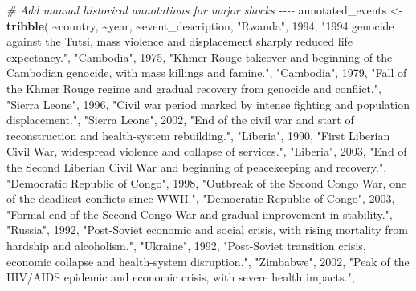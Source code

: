 \documentclass[
  11pt,
]{article}
\newenvironment{Shaded}{\begin{snugshade}}{\end{snugshade}}
\newcommand{\CommentTok}[1]{\textcolor[rgb]{0.56,0.35,0.01}{\textit{#1}}}
\newcommand{\DecValTok}[1]{\textcolor[rgb]{0.00,0.00,0.81}{#1}}
\newcommand{\FunctionTok}[1]{\textcolor[rgb]{0.13,0.29,0.53}{\textbf{#1}}}
\newcommand{\NormalTok}[1]{#1}
\newcommand{\OtherTok}[1]{\textcolor[rgb]{0.56,0.35,0.01}{#1}}
\newcommand{\SpecialCharTok}[1]{\textcolor[rgb]{0.81,0.36,0.00}{\textbf{#1}}}
\newcommand{\StringTok}[1]{\textcolor[rgb]{0.31,0.60,0.02}{#1}}
\begin{document}
\begin{Shaded}
\begin{Highlighting}[]
\CommentTok{\# Add manual historical annotations for major shocks {-}{-}{-}{-}}
\NormalTok{annotated\_events }\OtherTok{\textless{}{-}} \FunctionTok{tribble}\NormalTok{(}
  \SpecialCharTok{\textasciitilde{}}\NormalTok{country, }\SpecialCharTok{\textasciitilde{}}\NormalTok{year, }\SpecialCharTok{\textasciitilde{}}\NormalTok{event\_description,}
  \StringTok{"Rwanda"}\NormalTok{, }\DecValTok{1994}\NormalTok{, }\StringTok{"1994 genocide against the Tutsi, mass violence and displacement sharply reduced life expectancy."}\NormalTok{,}
  \StringTok{"Cambodia"}\NormalTok{, }\DecValTok{1975}\NormalTok{, }\StringTok{"Khmer Rouge takeover and beginning of the Cambodian genocide, with mass killings and famine."}\NormalTok{,}
  \StringTok{"Cambodia"}\NormalTok{, }\DecValTok{1979}\NormalTok{, }\StringTok{"Fall of the Khmer Rouge regime and gradual recovery from genocide and conflict."}\NormalTok{,}
  \StringTok{"Sierra Leone"}\NormalTok{, }\DecValTok{1996}\NormalTok{, }\StringTok{"Civil war period marked by intense fighting and population displacement."}\NormalTok{,}
  \StringTok{"Sierra Leone"}\NormalTok{, }\DecValTok{2002}\NormalTok{, }\StringTok{"End of the civil war and start of reconstruction and health{-}system rebuilding."}\NormalTok{,}
  \StringTok{"Liberia"}\NormalTok{, }\DecValTok{1990}\NormalTok{, }\StringTok{"First Liberian Civil War, widespread violence and collapse of services."}\NormalTok{,}
  \StringTok{"Liberia"}\NormalTok{, }\DecValTok{2003}\NormalTok{, }\StringTok{"End of the Second Liberian Civil War and beginning of peacekeeping and recovery."}\NormalTok{,}
  \StringTok{"Democratic Republic of Congo"}\NormalTok{, }\DecValTok{1998}\NormalTok{, }\StringTok{"Outbreak of the Second Congo War, one of the deadliest conflicts since WWII."}\NormalTok{,}
  \StringTok{"Democratic Republic of Congo"}\NormalTok{, }\DecValTok{2003}\NormalTok{, }\StringTok{"Formal end of the Second Congo War and gradual improvement in stability."}\NormalTok{,}
  \StringTok{"Russia"}\NormalTok{, }\DecValTok{1992}\NormalTok{, }\StringTok{"Post{-}Soviet economic and social crisis, with rising mortality from hardship and alcoholism."}\NormalTok{,}
  \StringTok{"Ukraine"}\NormalTok{, }\DecValTok{1992}\NormalTok{, }\StringTok{"Post{-}Soviet transition crisis, economic collapse and health{-}system disruption."}\NormalTok{,}
  \StringTok{"Zimbabwe"}\NormalTok{, }\DecValTok{2002}\NormalTok{, }\StringTok{"Peak of the HIV/AIDS epidemic and economic crisis, with severe health impacts."}\NormalTok{,}

\end{Highlighting}
\end{Shaded}
\end{document}

